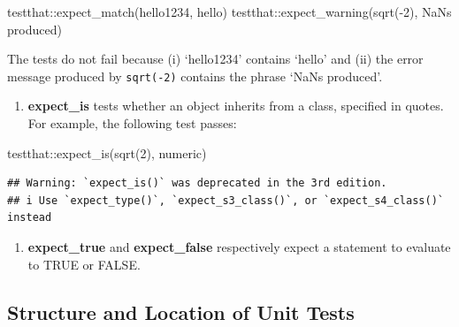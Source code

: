 \documentclass[
]{book}
\newenvironment{Shaded}{\begin{snugshade}}{\end{snugshade}}
\newcommand{\DecValTok}[1]{\textcolor[rgb]{0.00,0.00,0.81}{#1}}
\newcommand{\FunctionTok}[1]{\textcolor[rgb]{0.00,0.00,0.00}{#1}}
\newcommand{\NormalTok}[1]{#1}
\newcommand{\SpecialCharTok}[1]{\textcolor[rgb]{0.00,0.00,0.00}{#1}}
\newcommand{\StringTok}[1]{\textcolor[rgb]{0.31,0.60,0.02}{#1}}
\providecommand{\tightlist}{%
  \setlength{\itemsep}{0pt}\setlength{\parskip}{0pt}}
\begin{document}
\begin{Shaded}
\begin{Highlighting}[]
\NormalTok{testthat}\SpecialCharTok{::}\FunctionTok{expect\_match}\NormalTok{(}\StringTok{\textquotesingle{}hello1234\textquotesingle{}}\NormalTok{, }\StringTok{\textquotesingle{}hello\textquotesingle{}}\NormalTok{)}
\NormalTok{testthat}\SpecialCharTok{::}\FunctionTok{expect\_warning}\NormalTok{(}\FunctionTok{sqrt}\NormalTok{(}\SpecialCharTok{{-}}\DecValTok{2}\NormalTok{), }\StringTok{\textquotesingle{}NaNs produced\textquotesingle{}}\NormalTok{)}
\end{Highlighting}
\end{Shaded}

The tests do not fail because (i) `hello1234' contains `hello' and (ii) the error message produced by \texttt{sqrt(-2)} contains the phrase `NaNs produced'.

\begin{enumerate}
\def\labelenumi{\arabic{enumi}.}
\setcounter{enumi}{3}
\tightlist
\item
  \textbf{expect\_is} tests whether an object inherits from a class, specified in quotes. For example, the following test passes:
\end{enumerate}

\begin{Shaded}
\begin{Highlighting}[]
\NormalTok{testthat}\SpecialCharTok{::}\FunctionTok{expect\_is}\NormalTok{(}\FunctionTok{sqrt}\NormalTok{(}\DecValTok{2}\NormalTok{), }\StringTok{\textquotesingle{}numeric\textquotesingle{}}\NormalTok{)}
\end{Highlighting}
\end{Shaded}

\begin{verbatim}
## Warning: `expect_is()` was deprecated in the 3rd edition.
## i Use `expect_type()`, `expect_s3_class()`, or `expect_s4_class()` instead
\end{verbatim}

\begin{enumerate}
\def\labelenumi{\arabic{enumi}.}
\setcounter{enumi}{4}
\tightlist
\item
  \textbf{expect\_true} and \textbf{expect\_false} respectively expect a statement to evaluate to TRUE or FALSE.
\end{enumerate}

\hypertarget{structure-and-location-of-unit-tests}{%
\subsection{Structure and Location of Unit Tests}\label{structure-and-location-of-unit-tests}}
\end{document}
